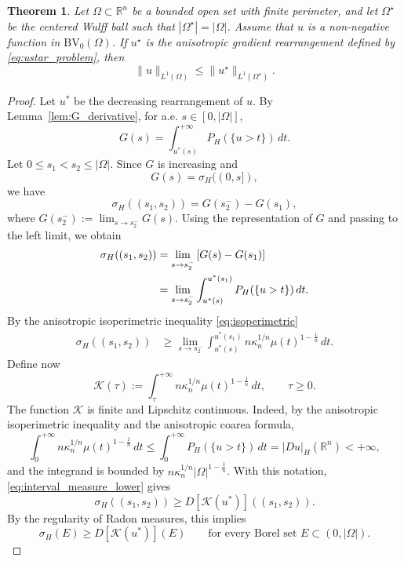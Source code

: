 \documentclass[10pt,a4paper]{amsart}
\newtheorem{theorem}{Theorem}
\newcommand{\BV}{\text{BV}}
\newcommand{\R}{\mathbb{R}}
\begin{document}
\begin{theorem}\label{thm:main_comparison}
Let $\Omega\subset\R^n$ be a bounded open set with finite perimeter, and let
$\Omega^\star$ be the centered Wulff ball such that $|\Omega^\star|=|\Omega|$.
Assume that $u$ is a non-negative function in $\BV_0(\Omega)$. If $u^\star$ is the
anisotropic gradient rearrangement defined by \eqref{eq:ustar_problem}, then
\begin{equation}\label{eq:main_inequality}
\|u\|_{L^1(\Omega)}\le \|u^\star\|_{L^1(\Omega^\star)}.
\end{equation}
\end{theorem}

\begin{proof}
Let $u^*$ be the decreasing rearrangement of $u$. By Lemma~\ref{lem:G_derivative}, for a.e.
$s\in[0,|\Omega|]$,
\[
G(s)=\int_{u^*(s)}^{+\infty} P_H(\{u>t\})\,dt .
\]
 Let
$0\le s_1<s_2\le |\Omega|$. Since \(G\) is increasing and
\[
G(s)=\sigma_H((0,s]),
\]
we have
\[
\sigma_H((s_1,s_2))
=
G(s_2^-)-G(s_1),
\]
where \(G(s_2^-):=\lim_{s\to s_2^-}G(s)\). Using the representation of \(G\)
and passing to the left limit, we obtain
\begin{align}
\sigma_H((s_1,s_2))
&=
\lim_{s\to s_2^-}
\left[
G(s)-G(s_1)
\right] \notag\\
&=
\lim_{s\to s_2^-}
\int_{u^*(s)}^{u^*(s_1)} P_H(\{u>t\})\,dt . \label{eq:sigma_interval_left}
\end{align}
By the anisotropic isoperimetric inequality \eqref{eq:isoperimetric}
\begin{align}
\sigma_H((s_1,s_2))
&\ge
\lim_{s\to s_2^-}
\int_{u^*(s)}^{u^*(s_1)}
n\kappa_n^{1/n}\mu(t)^{1-\frac1n}\,dt .
\label{eq:interval_measure_lower}
\end{align}
Define now 
\[
\mathcal K(\tau):=
\int_\tau^{+\infty}
n\kappa_n^{1/n}\mu(t)^{1-\frac1n}\,dt,
\qquad \tau\ge 0.
\]
The function \(\mathcal K\) is finite and Lipschitz continuous. Indeed, by the
anisotropic isoperimetric inequality and the anisotropic coarea formula,
\[
\int_0^{+\infty}
n\kappa_n^{1/n}\mu(t)^{1-\frac1n}\,dt
\le
\int_0^{+\infty} P_H(\{u>t\})\,dt
=
|Du|_H(\mathbb R^n)<+\infty,
\]
and the integrand is bounded by
\(n\kappa_n^{1/n}|\Omega|^{1-\frac1n}\).
With this notation, \eqref{eq:interval_measure_lower} gives
\[
\sigma_H((s_1,s_2))
\ge
D[\mathcal K(u^*)]((s_1,s_2)).
\]
By the regularity of Radon measures, this implies
\begin{equation}\label{eq:measure_domination}
\sigma_H(E)\ge D[\mathcal K(u^*)](E)
\qquad
\text{for every Borel set }E\subset(0,|\Omega|).
\end{equation}


\end{proof}
\end{document}
